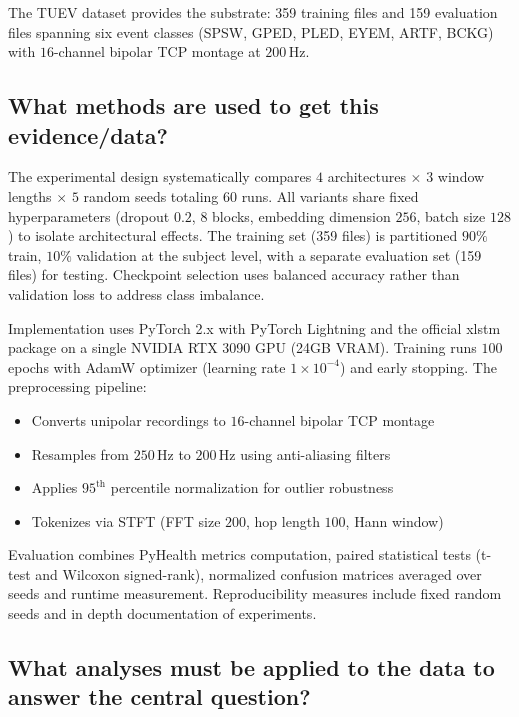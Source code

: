 The \ac{TUEV} dataset provides the substrate: 359 training files and 159 evaluation files spanning six event classes (\ac{SPSW}, \ac{GPED}, \ac{PLED}, \ac{EYEM}, \ac{ARTF}, \ac{BCKG}) with $16$-channel bipolar \ac{TCP} montage at $200\,\text{Hz}$.

\subsection{What methods are used to get this evidence/data?}

The experimental design systematically compares $4$ architectures $\times$ $3$ window lengths $\times$ $5$ random seeds totaling $60$ runs. All variants share fixed hyperparameters (dropout $0.2$, $8$ blocks, embedding dimension $256$, batch size $128$) to isolate architectural effects. The training set (359 files) is partitioned $90\%$ train, $10\%$ validation at the subject level, with a separate evaluation set (159 files) for testing. Checkpoint selection uses balanced accuracy rather than validation loss to address class imbalance.

Implementation uses PyTorch 2.x with PyTorch Lightning and the official xlstm package on a single NVIDIA RTX 3090 GPU (24GB VRAM). Training runs $100$ epochs with AdamW optimizer (learning rate $1 \times 10^{-4}$) and early stopping. The preprocessing pipeline:
\begin{itemize}
    \item Converts unipolar recordings to $16$-channel bipolar \ac{TCP} montage
    \item Resamples from $250\,\text{Hz}$ to $200\,\text{Hz}$ using anti-aliasing filters
    \item Applies $95^{\text{th}}$ percentile normalization for outlier robustness
    \item Tokenizes via \ac{STFT} (FFT size $200$, hop length $100$, Hann window)
\end{itemize}

Evaluation combines PyHealth metrics computation, paired statistical tests (t-test and Wilcoxon signed-rank), normalized confusion matrices averaged over seeds and runtime measurement. Reproducibility measures include fixed random seeds and in depth documentation of experiments.

\subsection{What analyses must be applied to the data to answer the central question?}

